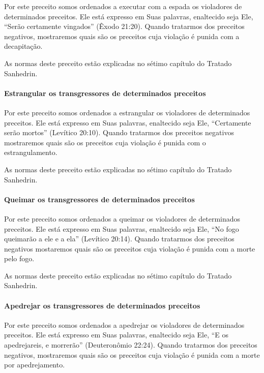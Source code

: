 Por este preceito somos ordenados a executar com a espada os violadores
de determinados preceitos. Ele está expresso em Suas palavras,
enaltecido seja Ele, ``Serão certamente vingados'' (Êxodo 21:20).
Quando tratarmos dos preceitos negativos, mostraremos quais são os
preceitos cuja violação é punida com a decapitação.

As normas deste preceito estão explicadas no sétimo capítulo do Tratado
Sanhedrin.

\paragraph{Estrangular os transgressores de determinados preceitos}

Por este preceito somos ordenados a estrangular os violadores de
determinados preceitos. Ele está expresso em Suas palavras, enaltecido
seja Ele, ``Certamente serão mortos'' (Levítico 20:10). Quando tratarmos
dos preceitos negativos mostraremos quais são os preceitos cuja violação
é punida com o estrangulamento.

As normas deste preceito estão explicadas no sétimo capítulo do Tratado
Sanhedrin.

\paragraph{Queimar os transgressores de determinados preceitos}

Por este preceito somos ordenados a queimar os violadores de
determinados preceitos. Ele está expresso em Suas palavras, enaltecido
seja Ele, ``No fogo queimarão a ele e a ela'' (Levítico 20:14). Quando
tratarmos dos preceitos negativos mostaremos quais são os preceitos
cuja violação é punida com a morte pelo fogo.

As normas deste preceito estão explicadas no sétimo capítulo do Tratado
Sanhedrin.

\paragraph{Apedrejar os transgressores de determinados preceitos}

Por este preceito somos ordenados a apedrejar os violadores de
determinados preceitos. Ele está expresso em Suas palavras, enaltecido
seja Ele, ``E os apedrejareis, e morrerão'' (Deuteronômio 22:24). Quando
tratarmos dos preceitos negativos, mostraremos quais são os preceitos
cuja violação é punida com a morte por apedrejamento.

